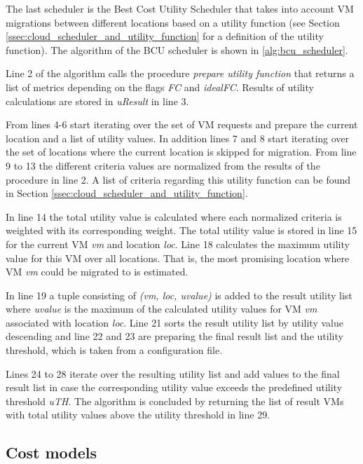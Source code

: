 The last scheduler is the Best Cost Utility Scheduler that takes into account VM migrations between different locations based on a utility function (see Section \ref{ssec:cloud_scheduler_and_utility_function} for a definition of the utility function). 
The algorithm of the BCU scheduler is shown in \ref{alg:bcu_scheduler}. 

Line 2 of the algorithm calls the procedure \textit{prepare utility function} that returns a list of metrics depending on the flags \textit{FC} and \textit{idealFC}. Results of utility calculations are stored in \textit{uResult} in line 3. 

From lines 4-6 start iterating over the set of VM requests and prepare the current location and a list of utility values. In addition lines 7 and 8 start iterating over the set of locations where the current location is skipped for migration. From line 9 to 13 the different criteria values are normalized from the results of the procedure in line 2. A list of criteria regarding this utility function can be found in Section \ref{ssec:cloud_scheduler_and_utility_function}. 

In line 14 the total utility value is calculated where each normalized criteria is weighted with its corresponding weight. The total utility value  is stored in line 15 for the current VM \textit{vm} and location \textit{loc}. Line 18 calculates the maximum utility value for this VM over all locations. That is, the most promising location where VM \textit{vm} could be migrated to is estimated. 

In line 19 a tuple consisting of \textit{(vm, loc, uvalue)} is added to the result utility list where \textit{uvalue} is the maximum of the calculated utility values for VM \textit{vm} associated with location \textit{loc}. 
Line 21 sorts the result utility list by utility value descending and line 22 and 23 are preparing the final result list and the utility threshold, which is taken from a configuration file. 

Lines 24 to 28 iterate over the resulting utility list and add values to the final result list in case the corresponding utility value exceeds the predefined utility threshold \textit{uTH}. 
The algorithm is concluded by returning the list of result VMs with total utility values above the utility threshold in line 29. 



\subsection{Cost models}

